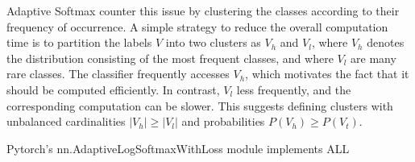 Adaptive Softmax \parencite{Grave.14092016} counter this issue by clustering the classes according to their frequency of occurrence. A simple strategy to reduce the overall computation time is to partition the labels \(V\) into two clusters as \(V_h\) and \(V_l\), where \(V_h\) denotes the distribution consisting of the most frequent classes, and where \(V_l\) are many rare classes. The classifier frequently accesses \(V_h\), which motivates the fact that it should be computed efficiently. In contrast,  \(V_l\) less frequently, and the corresponding computation can be slower. This suggests defining clusters with unbalanced cardinalities \(|V_h| \geq |V_l|\) and probabilities \(P(V_h) \geq P(V_t)\).

Pytorch's \parencite{Paszke.03122019} nn.AdaptiveLogSoftmaxWithLoss module implements \acf{ALL}
